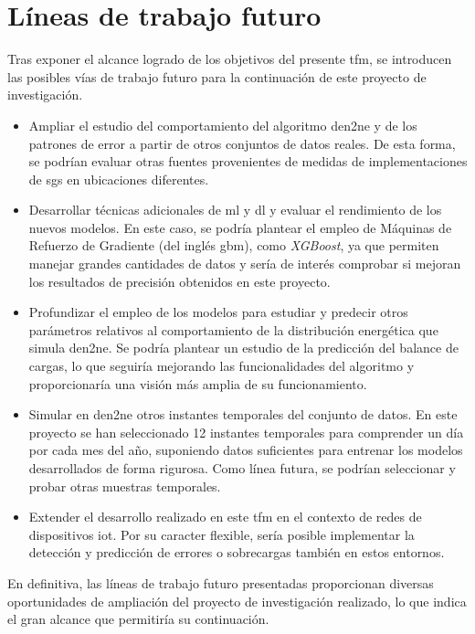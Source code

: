 \section{Líneas de trabajo futuro}
\label{trabajoFuturo}

Tras exponer el alcance logrado de los objetivos del presente \gls{tfm}, se introducen las posibles vías de trabajo futuro para la continuación de este proyecto de investigación.

\begin{itemize}
    \item Ampliar el estudio del comportamiento del algoritmo \gls{den2ne} y de los patrones de error a partir de otros conjuntos de datos reales. De esta forma, se podrían evaluar otras fuentes provenientes de medidas de implementaciones de \gls{sg}s en ubicaciones diferentes.
    \item Desarrollar técnicas adicionales de \gls{ml} y \gls{dl} y evaluar el rendimiento de los nuevos modelos. En este caso, se podría plantear el empleo de Máquinas de Refuerzo de Gradiente (del inglés \gls{gbm}), como \textit{XGBoost}, ya que permiten manejar grandes cantidades de datos y sería de interés comprobar si mejoran los resultados de precisión obtenidos en este proyecto.
    \item Profundizar el empleo de los modelos para estudiar y predecir otros parámetros relativos al comportamiento de la distribución energética que simula \gls{den2ne}. Se podría plantear un estudio de la predicción del balance de cargas, lo que seguiría mejorando las funcionalidades del algoritmo y proporcionaría una visión más amplia de su funcionamiento.
    \item Simular en \gls{den2ne} otros instantes temporales del conjunto de datos. En este proyecto se han seleccionado 12 instantes temporales para comprender un día por cada mes del año, suponiendo datos suficientes para entrenar los modelos desarrollados de forma rigurosa. Como línea futura, se podrían seleccionar y probar otras muestras temporales.
    \item Extender el desarrollo realizado en este \gls{tfm} en el contexto de redes de dispositivos \gls{iot}. Por su caracter flexible, sería posible implementar la detección y predicción de errores o sobrecargas también en estos entornos.
\end{itemize}

En definitiva, las líneas de trabajo futuro presentadas proporcionan diversas oportunidades de ampliación del proyecto de investigación realizado, lo que indica el gran alcance que permitiría su continuación.